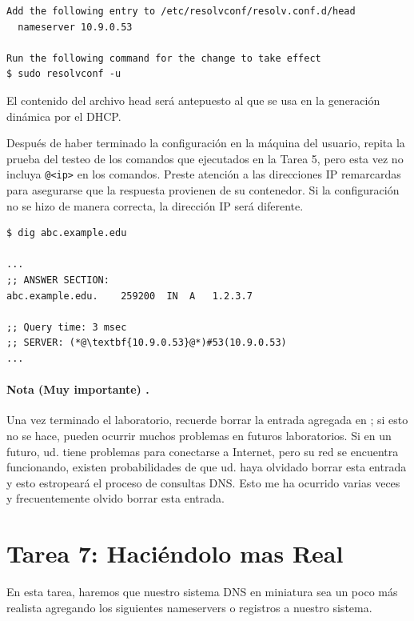 \begin{lstlisting}
Add the following entry to /etc/resolvconf/resolv.conf.d/head
  nameserver 10.9.0.53

Run the following command for the change to take effect
$ sudo resolvconf -u
\end{lstlisting}

El contenido del archivo head será antepuesto al que se usa en la generación dinámica por el DHCP.

Después de haber terminado la configuración en la máquina del usuario, repita la prueba del testeo de los comandos que ejecutados en la Tarea 5, pero esta vez no incluya \texttt{@<ip>} en los comandos. Preste atención a las direcciones IP remarcardas para asegurarse que la respuesta provienen de su contenedor. Si la configuración no se hizo de manera correcta, la dirección IP será diferente.

\begin{lstlisting}
$ dig abc.example.edu

...
;; ANSWER SECTION:
abc.example.edu.	259200	IN	A	1.2.3.7

;; Query time: 3 msec
;; SERVER: (*@\textbf{10.9.0.53}@*)#53(10.9.0.53)
...
\end{lstlisting}
 

\paragraph{ Nota (Muy importante) .} 
Una vez terminado el laboratorio, recuerde borrar la entrada agregada en ; si esto no se hace, pueden ocurrir muchos problemas en futuros laboratorios. Si en un futuro, ud. tiene problemas para conectarse a Internet, pero su red se encuentra funcionando, existen probabilidades de que ud. haya olvidado borrar esta entrada y esto estropeará el proceso de consultas DNS. Esto me ha ocurrido varias veces y frecuentemente olvido borrar esta entrada. 


\section{Tarea 7: Haciéndolo mas Real}

En esta tarea, haremos que nuestro sistema DNS en miniatura sea un poco más realista agregando los siguientes nameservers o registros a nuestro sistema.


